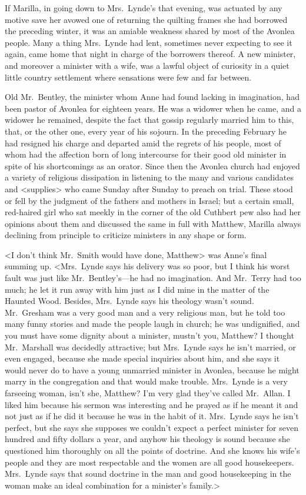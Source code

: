 If Marilla, in going down to Mrs.~Lynde's that evening, was actuated by any motive save her avowed one of returning the quilting frames she had borrowed the preceding winter, it was an amiable weakness shared by most of the Avonlea people. Many a thing Mrs.~Lynde had lent, sometimes never expecting to see it again, came home that night in charge of the borrowers thereof. A new minister, and moreover a minister with a wife, was a lawful object of curiosity in a quiet little country settlement where sensations were few and far between.

Old Mr.~Bentley, the minister whom Anne had found lacking in imagination, had been pastor of Avonlea for eighteen years. He was a widower when he came, and a widower he remained, despite the fact that gossip regularly married him to this, that, or the other one, every year of his sojourn. In the preceding February he had resigned his charge and departed amid the regrets of his people, most of whom had the affection born of long intercourse for their good old minister in spite of his shortcomings as an orator. Since then the Avonlea church had enjoyed a variety of religious dissipation in listening to the many and various candidates and <supplies> who came Sunday after Sunday to preach on trial. These stood or fell by the judgment of the fathers and mothers in Israel; but a certain small, red-haired girl who sat meekly in the corner of the old Cuthbert pew also had her opinions about them and discussed the same in full with Matthew, Marilla always declining from principle to criticize ministers in any shape or form.

<I don't think Mr.~Smith would have done, Matthew> was Anne's final summing up. <Mrs.~Lynde says his delivery was so poor, but I think his worst fault was just like Mr.~Bentley's—he had no imagination. And Mr.~Terry had too much; he let it run away with him just as I did mine in the matter of the Haunted Wood. Besides, Mrs.~Lynde says his theology wasn't sound. Mr.~Gresham was a very good man and a very religious man, but he told too many funny stories and made the people laugh in church; he was undignified, and you must have some dignity about a minister, mustn't you, Matthew? I thought Mr.~Marshall was decidedly attractive; but Mrs.~Lynde says he isn't married, or even engaged, because she made special inquiries about him, and she says it would never do to have a young unmarried minister in Avonlea, because he might marry in the congregation and that would make trouble. Mrs.~Lynde is a very farseeing woman, isn't she, Matthew? I'm very glad they've called Mr.~Allan. I liked him because his sermon was interesting and he prayed as if he meant it and not just as if he did it because he was in the habit of it. Mrs.~Lynde says he isn't perfect, but she says she supposes we couldn't expect a perfect minister for seven hundred and fifty dollars a year, and anyhow his theology is sound because she questioned him thoroughly on all the points of doctrine. And she knows his wife's people and they are most respectable and the women are all good housekeepers. Mrs.~Lynde says that sound doctrine in the man and good housekeeping in the woman make an ideal combination for a minister's family.>

